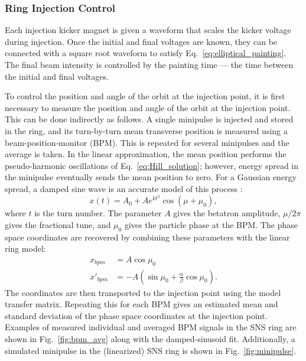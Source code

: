 \subsubsection{Ring Injection Control}

Each injection kicker magnet is given a waveform that scales the kicker voltage during injection. Once the initial and final voltages are known, they can be connected with a square root waveform to satisfy Eq.~\eqref{eq:elliptical_painting}. The final beam intensity is controlled by the painting time — the time between the initial and final voltages.

To control the position and angle of the orbit at the injection point, it is first necessary to measure the position and angle of the orbit at the injection point. This can be done indirectly as follows. A single minipulse is injected and stored in the ring, and its turn-by-turn mean transverse position is measured using a beam-position-monitor (BPM). This is repeated for several minipulses and the average is taken. In the linear approximation, the mean position performs the pseudo-harmonic oscillations of Eq.~\eqref{eq:Hill_solution}; however, energy spread in the minipulse eventually sends the mean position to zero. For a Gaussian energy spread, a damped sine wave is an accurate model of this process \cite{Pelaia2016}:
%
\begin{equation}\label{eq:damped_sinusoid}
    x(t) = A_0 + A e^{kt^2} \cos{\left(\mu + \mu_0\right)},
\end{equation}
%
where $t$ is the turn number. The parameter $A$ gives the betatron amplitude, $\mu / 2\pi$ gives the fractional tune, and $\mu_0$ gives the particle phase at the BPM. The phase space coordinates are recovered by combining these parameters with the linear ring model:
%
\begin{equation}
\begin{aligned}
    x_{bpm} &= A \cos\mu_0 \\ 
    x'_{bpm} &= -A\left({\sin\mu_0 + \frac{\alpha}{\beta}\cos\mu_0}\right).
\end{aligned}
\end{equation}
%
The coordinates are then transported to the injection point using the model transfer matrix. Repeating this for each BPM gives an estimated mean and standard deviation of the phase space coordinates at the injection point. Examples of measured individual and averaged BPM signals in the SNS ring are shown in Fig.~\ref{fig:bpm_avg} along with the damped-sinusoid fit. Additionally, a simulated minipulse in the (linearized) SNS ring is shown in Fig.~\ref{fig:minipulse}.
